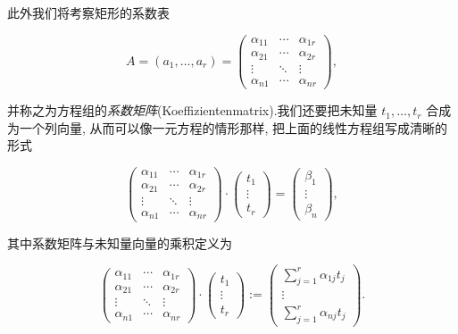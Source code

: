 此外我们将考察矩形的系数表

\[
A = (a_1, \ldots, a_r) =
\begin{pmatrix}
\alpha_{11} & \cdots & \alpha_{1r} \\
\alpha_{21} & \cdots & \alpha_{2r} \\
\vdots & \ddots & \vdots \\
\alpha_{n1} & \cdots & \alpha_{nr}
\end{pmatrix},
\]

并称之为方程组的\emph{系数矩阵}(\textup{Koeffizientenmatrix}).我们还要把未知量 $t_1, \ldots, t_r$ 合成为一个列向量, 从而可以像一元方程的情形那样, 把上面的线性方程组写成清晰的形式

\[
\begin{pmatrix}
\alpha_{11} & \cdots & \alpha_{1r} \\
\alpha_{21} & \cdots & \alpha_{2r} \\
\vdots & \ddots & \vdots \\
\alpha_{n1} & \cdots & \alpha_{nr}
\end{pmatrix}
\cdot
\begin{pmatrix} t_1 \\ \vdots \\ t_r \end{pmatrix}
=
\begin{pmatrix} \beta_1 \\ \vdots \\ \beta_n \end{pmatrix},
\]

其中系数矩阵与未知量向量的乘积定义为

\[
\begin{pmatrix}
\alpha_{11} & \cdots & \alpha_{1r} \\
\alpha_{21} & \cdots & \alpha_{2r} \\
\vdots & \ddots & \vdots \\
\alpha_{n1} & \cdots & \alpha_{nr}
\end{pmatrix}
\cdot
\begin{pmatrix} t_1 \\ \vdots \\ t_r \end{pmatrix}
:=
\begin{pmatrix}
\sum_{j = 1}^{r}\alpha_{1j}t_j \\
\vdots \\
\sum_{j = 1}^{r}\alpha_{nj}t_j
\end{pmatrix}\text{.}
\]

